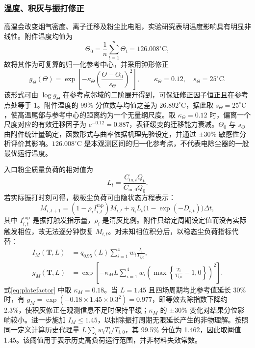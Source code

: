 \subsubsection{温度、积灰与振打修正}

高温会改变烟气密度、离子迁移及粉尘比电阻，实验研究表明温度影响具有明显非线性\cite{xu2015hightemp}。附件温度均值为
\begin{equation}
\Theta_0=\frac{1}{n}\sum_{t=1}^{n}\Theta_t=126.008^\circ\mathrm C,
\label{eq:tempref}
\end{equation}
故将其作为可复算的归一化参考中心，并采用钟形修正
\begin{equation}
g_\Theta(\Theta)=\exp\left[-\kappa_\Theta
\left(\frac{\Theta-\Theta_0}{s_\Theta}\right)^2\right],
\qquad \kappa_\Theta=0.12,\quad s_\Theta=25^\circ\mathrm C.
\label{eq:tempfactor}
\end{equation}
该形式可由 $\log g_\Theta$ 在参考点邻域的二阶展开得到，可保证修正因子恒正且在参考点处等于 1。附件温度的 99\% 分位数与均值之差为 $26.892^\circ\mathrm C$，据此取 $s_\Theta=25^\circ\mathrm C$，使高温尾部与参考中心的距离约为一个无量纲尺度。取 $\kappa_\Theta=0.12$ 时，偏离一个尺度对应的有效迁移因子为 $e^{-0.12}=0.887$，表征缓变的迁移能力衰减。$\Theta_0$ 与 $s_\Theta$ 由附件统计量确定，函数形式与曲率依据机理先验设定，并通过 $\pm30\%$ 敏感性分析评价其影响。$126.008^\circ\mathrm C$ 是本观测区间的归一化参考点，不代表电除尘器的一般最优运行温度。

入口粉尘质量负荷的相对值为
\begin{equation}
L_t=\frac{C_{\mathrm{in},t}Q_t}{C_{\mathrm{in},0}Q_0}.
\label{eq:loadratio}
\end{equation}
若实际振打时刻可得，极板尘负荷可由隐状态方程表示：
\begin{equation}
M_{i,t+1}=(1-\rho_i I_{i,t}^{\mathrm{rap}})M_{i,t}
+\eta_i L_t\bigl(1-\exp(-D_{i,t})\bigr)\Delta t,
\label{eq:duststate}
\end{equation}
其中 $I_{i,t}^{\mathrm{rap}}$ 是振打触发指示量，$\rho_i$ 是清灰比例。附件只给定周期设定值而没有实际触发相位，故无法逐分钟恢复 $M_{i,t}$。对未知相位积分后，以稳态尘负荷指标代替：
\begin{align}
I_M(\bm T,L)&=q_{0.95}(L)\sum_{i=1}^{4}w_i\frac{T_i}{T_{i,0}},\label{eq:dustindex}\\
g_M(\bm T,L)&=\exp\left[-\kappa_M L
\sum_{i=1}^{4}w_i\left(\max\left\{\frac{T_i}{T_{i,0}}-1,0\right\}\right)^2\right].\label{eq:platefactor}
\end{align}
式\eqref{eq:platefactor} 中取 $\kappa_M=0.18$。当 $L=1.45$ 且四场周期均比参考值延长 30\% 时，有 $g_M=\exp(-0.18\times1.45\times0.3^2)=0.977$，即等效去除指数下降约 2.3\%，使积灰修正在观测信息不足时保持平缓；$\kappa_M$ 的 $\pm30\%$ 变化对结果分位影响较小。进一步施加 $I_M\le1.45$，以排除振打周期无限延长产生的非物理解。按照同一定义计算历史代理量 $L\sum_iw_iT_i/T_{i,0}$，其 99.5\% 分位为 1.462，因此取阈值 1.45。该阈值用于表示历史高负荷运行范围，并非材料失效常数。

